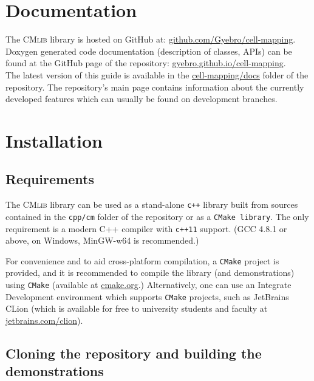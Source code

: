 \documentclass[11pt]{article}
\begin{document}
\newpage
\section{Documentation}

The \textsc{CMlib} library is hosted on GitHub at: \href{https://github.com/Gyebro/cell-mapping}{github.com/Gyebro/cell-mapping}.\\
Doxygen generated code documentation (description of classes, APIs) can be found at the GitHub page of the repository: \href{https://gyebro.github.io/cell-mapping}{gyebro.github.io/cell-mapping}.\\
The latest version of this guide is available in the  \href{https://github.com/Gyebro/cell-mapping/blob/master/docs/tex/cell-mapping-cpp.pdf}{cell-mapping/docs} folder of the repository.
The repository's main page contains information about the currently developed features which can usually be found on development branches.

\section{Installation}

\subsection{Requirements}

The \textsc{CMlib} library can be used as a stand-alone \texttt{c++} library built from sources contained in the \texttt{cpp/cm} folder of the repository or as a \texttt{CMake library}. The only requirement is a modern C++ compiler with \texttt{c++11} support. (GCC 4.8.1 or above, on Windows, MinGW-w64 is recommended.)

For convenience and to aid cross-platform compilation, a \texttt{CMake} project is provided, and it is recommended to compile the library (and demonstrations) using \texttt{CMake} (available at \href{https://cmake.org/}{cmake.org}.) 
Alternatively, one can use an Integrate Development environment which supports \texttt{CMake} projects, such as JetBrains CLion (which is available for free to university students and faculty at \href{https://www.jetbrains.com/clion/}{jetbrains.com/clion}).

\subsection{Cloning the repository and building the demonstrations}
\end{document}
